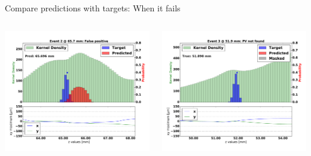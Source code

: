 \begin{frame}{Compare predictions with targets: When it fails}
  \begin{columns}[c]
        \begin{center}
           \includegraphics[width=1\textwidth, trim=60 0 60 0]{images/07Jan19_AltCNN4Layer_D35_sp_10.pdf}
        \end{center}
        \begin{center}
           \includegraphics[width=1\textwidth, trim=60 0 60 0]{images/07Jan19_AltCNN4Layer_D35_sp_15.pdf}
       \end{center}
  \end{columns}
\end{frame}
